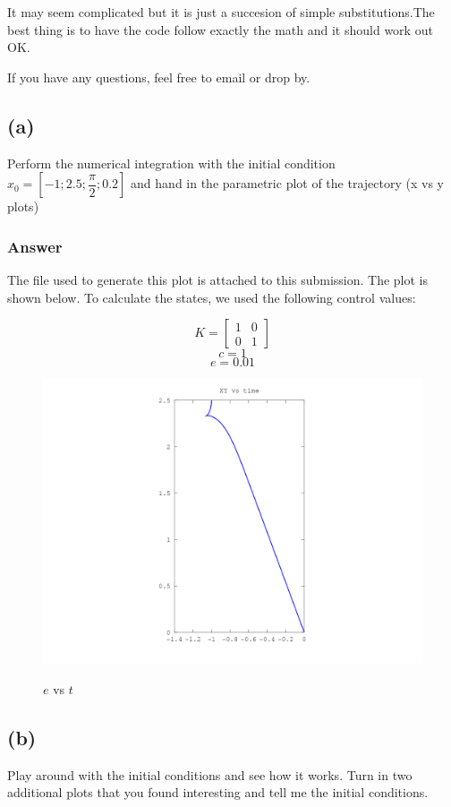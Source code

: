 \documentclass[10pt,a4paper]{article}
\begin{document}
It may seem complicated but it is just a succesion of simple substitutions.The best thing is to have the code follow exactly the math and it should work out OK.

If you have any questions, feel free to email or drop by.

\subsection*{(a)}
Perform the numerical integration with the initial condition $x_{0} = [-1;2.5;\dfrac{\pi}{2}; 0.2]$ and hand in the parametric plot of the trajectory (x vs y plots)
\subsubsection*{Answer}
The file used to generate this plot is attached to this submission. The plot is shown below. To calculate the states, we used the following control values:

\[ K = \begin{bmatrix}
   1 & 0 \\
   0 & 1 
   \end{bmatrix} \]
\[ c = 1 \]
\[ e = 0.01 \]

\begin{figure}[H]
  \centering
  \includegraphics[angle = 0, scale = 0.4]{figures/Question2aXyt.png} 
  \label{fig:Q2aTrajectory}
  \caption{$e$ vs $t$}
\end{figure}


\subsection*{(b)}
Play around with the initial conditions and see how it works. Turn in two additional plots that you found interesting and tell me the initial conditions.
\end{document}
